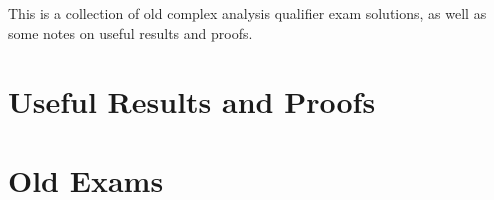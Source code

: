 \documentclass[10pt]{mypackage}
\begin{document}
\RaggedRight
This is a collection of old complex analysis qualifier exam solutions, as well as some notes on useful results and proofs.
\section{Useful Results and Proofs}%

\section{Old Exams}%
\end{document}
